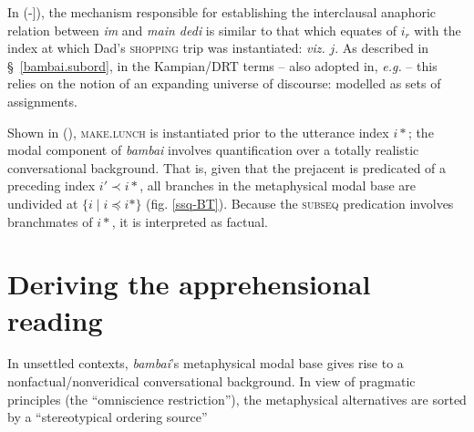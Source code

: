 \xe


\noindent In (-]), the mechanism responsible for establishing the interclausal anaphoric relation between \textit{im} and \textit{main dedi} is similar to that which equates of $ i_r $ with the index at which Dad's \textsc{shopping} trip was instantiated: \textit{viz.} $ j $. As described in \S~\ref{bambai.subord}, in the Kampian/DRT terms \citep[\textit{e.g.},][Ch. 5]{Kamp1993} -- also adopted in, \textit{e.g.} \citealp{Partee} -- this relies on the notion of an expanding universe of discourse: modelled as sets of assignments.


Shown in (), \textsc{make.lunch} is instantiated prior to the utterance index $ i* $; the modal component of \textit{bambai} involves quantification over a totally realistic conversational background. That is, given that the prejacent is predicated of a preceding index $ i'\prec i* $, all branches in the metaphysical modal base are undivided at $ \{i\mid i\preccurlyeq i*\} $ (fig. \ref{ssq-BT}). Because the \textsc{subseq} predication involves branchmates of $ i* $, it is interpreted as factual.


\section{Deriving the apprehensional reading}

In unsettled contexts, \textit{bambai}'s metaphysical modal base gives rise to a nonfactual/nonveridical conversational background. In view of pragmatic principles (the ``omniscience restriction''), the metaphysical alternatives are sorted by a ``stereotypical ordering source'' \citetext{\citealp[\textit{e.g.},][37\textit{ff}]{Kratzer2012} \textit{i.a.}.} 







